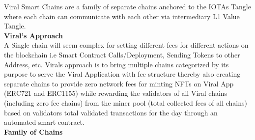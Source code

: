 \documentclass[10pt]{article}
\begin{document}
Viral Smart Chains are a family of separate chains anchored to the IOTA\textsc{}s Tangle where each chain can communicate with each other via intermediary L1 Value Tangle.\\

\textbf{Viral's Approach}\\

A Single chain will seem complex for setting different fees for different actions on the blockchain i.e Smart Contract Calls/Deployment, Sending Tokens to other Address, etc. Viral\textsc{}s approach is to bring multiple chains categorized by its purpose to serve the Viral Application with fee structure thereby also creating separate chains to provide zero network fees for minting NFTs on Viral App (ERC721 and ERC1155) while rewarding the validators of all Viral chains (including zero fee chains) from the miner pool (total collected fees of all chains) based on validator\textsc{}s total validated transactions for the day through an automated smart contract.\\

\textbf{Family of Chains}
\end{document}
